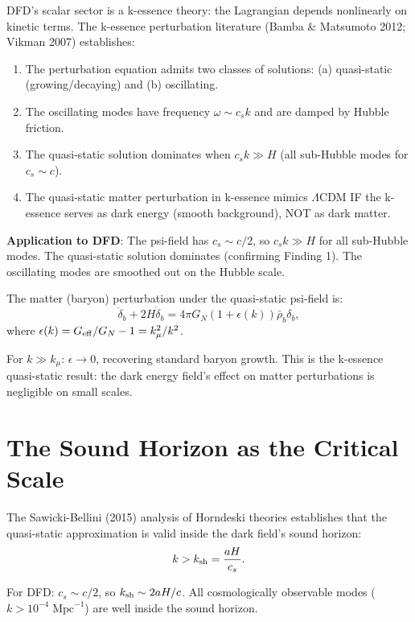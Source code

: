 \documentclass[11pt]{article}
\newcommand{\LCDM}{$\Lambda$CDM}
\newcommand{\Geff}{G_{\rm eff}}
\begin{document}
DFD's scalar sector is a k-essence theory: the Lagrangian depends
nonlinearly on kinetic terms. The k-essence perturbation literature
(Bamba \& Matsumoto 2012; Vikman 2007) establishes:

\begin{enumerate}[nosep]
\item The perturbation equation admits two classes of solutions:
  (a) quasi-static (growing/decaying) and (b) oscillating.
\item The oscillating modes have frequency $\omega \sim c_s k$
  and are damped by Hubble friction.
\item The quasi-static solution dominates when $c_s k \gg H$
  (all sub-Hubble modes for $c_s \sim c$).
\item The quasi-static matter perturbation in k-essence mimics
  \LCDM{} IF the k-essence serves as dark energy (smooth
  background), NOT as dark matter.
\end{enumerate}

\textbf{Application to DFD}: The psi-field has $c_s \sim c/2$,
so $c_s k \gg H$ for all sub-Hubble modes. The quasi-static
solution dominates (confirming Finding 1). The oscillating
modes are smoothed out on the Hubble scale.

The matter (baryon) perturbation under the quasi-static psi-field
is:
\begin{equation}
\ddot\delta_b + 2H\dot\delta_b
= 4\pi G_N (1 + \epsilon(k)) \bar\rho_b \delta_b,
\end{equation}
where $\epsilon(k) = \Geff/G_N - 1 = k_\mu^2/k^2$.

For $k \gg k_\mu$: $\epsilon \to 0$, recovering standard baryon
growth. This is the k-essence quasi-static result: the dark energy
field's effect on matter perturbations is negligible on small scales.

\section{The Sound Horizon as the Critical Scale}

The Sawicki-Bellini (2015) analysis of Horndeski theories establishes
that the quasi-static approximation is valid inside the dark field's
sound horizon:
\begin{equation}
k > k_{\rm sh} = \frac{aH}{c_s}.
\end{equation}

For DFD: $c_s \sim c/2$, so $k_{\rm sh} \sim 2aH/c$. All
cosmologically observable modes ($k > 10^{-4}\;\text{Mpc}^{-1}$) are
well inside the sound horizon.
\end{document}
